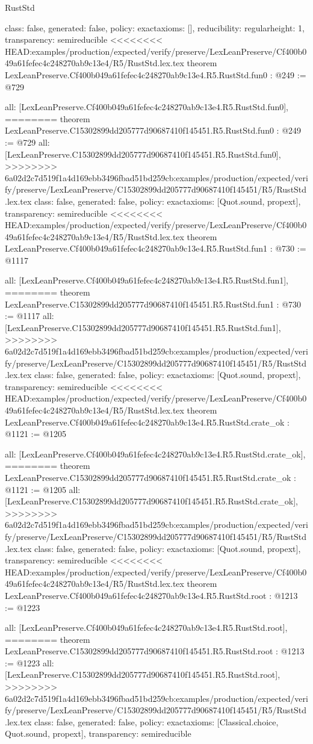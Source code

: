 \begin{lexlean}{RustStd}
\begin{coremodule}
{\begin{coremodule}
{{{  class: false,
  generated: false,
  policy: exact{axioms: []},
  reducibility: regular{height: 1},
  transparency: semireducible
}
<<<<<<<< HEAD:examples/production/expected/verify/preserve/LexLeanPreserve/Cf400b049a61fefec4c248270ab9c13e4/R5/RustStd.lex.tex
theorem LexLeanPreserve.Cf400b049a61fefec4c248270ab9c13e4.R5.RustStd.fun0 : @249 := @729 {
  all: [LexLeanPreserve.Cf400b049a61fefec4c248270ab9c13e4.R5.RustStd.fun0],
========
theorem LexLeanPreserve.C15302899dd205777d90687410f145451.R5.RustStd.fun0 : @249 := @729 {
  all: [LexLeanPreserve.C15302899dd205777d90687410f145451.R5.RustStd.fun0],
>>>>>>>> 6a02d2c7d519f1a4d169ebb3496fbad51bd259cb:examples/production/expected/verify/preserve/LexLeanPreserve/C15302899dd205777d90687410f145451/R5/RustStd.lex.tex
  class: false,
  generated: false,
  policy: exact{axioms: [Quot.sound, propext]},
  transparency: semireducible
}
<<<<<<<< HEAD:examples/production/expected/verify/preserve/LexLeanPreserve/Cf400b049a61fefec4c248270ab9c13e4/R5/RustStd.lex.tex
theorem LexLeanPreserve.Cf400b049a61fefec4c248270ab9c13e4.R5.RustStd.fun1 : @730 := @1117 {
  all: [LexLeanPreserve.Cf400b049a61fefec4c248270ab9c13e4.R5.RustStd.fun1],
========
theorem LexLeanPreserve.C15302899dd205777d90687410f145451.R5.RustStd.fun1 : @730 := @1117 {
  all: [LexLeanPreserve.C15302899dd205777d90687410f145451.R5.RustStd.fun1],
>>>>>>>> 6a02d2c7d519f1a4d169ebb3496fbad51bd259cb:examples/production/expected/verify/preserve/LexLeanPreserve/C15302899dd205777d90687410f145451/R5/RustStd.lex.tex
  class: false,
  generated: false,
  policy: exact{axioms: [Quot.sound, propext]},
  transparency: semireducible
}
<<<<<<<< HEAD:examples/production/expected/verify/preserve/LexLeanPreserve/Cf400b049a61fefec4c248270ab9c13e4/R5/RustStd.lex.tex
theorem LexLeanPreserve.Cf400b049a61fefec4c248270ab9c13e4.R5.RustStd.crate_ok : @1121 := @1205 {
  all: [LexLeanPreserve.Cf400b049a61fefec4c248270ab9c13e4.R5.RustStd.crate_ok],
========
theorem LexLeanPreserve.C15302899dd205777d90687410f145451.R5.RustStd.crate_ok : @1121 := @1205 {
  all: [LexLeanPreserve.C15302899dd205777d90687410f145451.R5.RustStd.crate_ok],
>>>>>>>> 6a02d2c7d519f1a4d169ebb3496fbad51bd259cb:examples/production/expected/verify/preserve/LexLeanPreserve/C15302899dd205777d90687410f145451/R5/RustStd.lex.tex
  class: false,
  generated: false,
  policy: exact{axioms: [Quot.sound, propext]},
  transparency: semireducible
}
<<<<<<<< HEAD:examples/production/expected/verify/preserve/LexLeanPreserve/Cf400b049a61fefec4c248270ab9c13e4/R5/RustStd.lex.tex
theorem LexLeanPreserve.Cf400b049a61fefec4c248270ab9c13e4.R5.RustStd.root : @1213 := @1223 {
  all: [LexLeanPreserve.Cf400b049a61fefec4c248270ab9c13e4.R5.RustStd.root],
========
theorem LexLeanPreserve.C15302899dd205777d90687410f145451.R5.RustStd.root : @1213 := @1223 {
  all: [LexLeanPreserve.C15302899dd205777d90687410f145451.R5.RustStd.root],
>>>>>>>> 6a02d2c7d519f1a4d169ebb3496fbad51bd259cb:examples/production/expected/verify/preserve/LexLeanPreserve/C15302899dd205777d90687410f145451/R5/RustStd.lex.tex
  class: false,
  generated: false,
  policy: exact{axioms: [Classical.choice, Quot.sound, propext]},
  transparency: semireducible
}

}}}}}}
\end{coremodule}}
\end{coremodule}
\end{lexlean}
